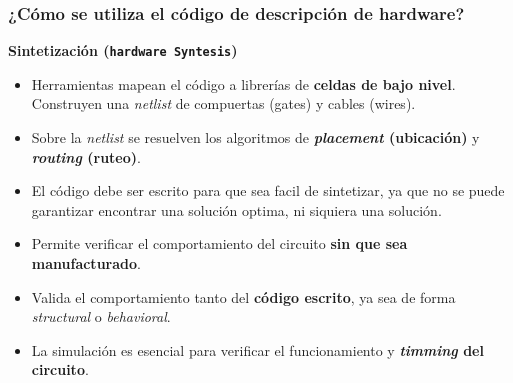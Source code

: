 \documentclass[aspectratio=169]{beamer}
\begin{document}
\begin{frame}[fragile,t]
\frametitle{¿Cómo se utiliza el código de descripción de hardware?}
    \textcolor{naranjauca}{\textbf{Sintetización (\texttt{hardware Syntesis})}}
    \begin{itemize}
    \item<1-> Herramientas mapean el código a librerías de \textbf{celdas de bajo nivel}.\\
    Construyen una \emph{netlist} de compuertas (gates) y cables (wires).
    \item<2-> Sobre la \emph{netlist} se resuelven los algoritmos de \textbf{\emph{placement} (ubicación)} y \textbf{\emph{routing} (ruteo)}.
    \item<3-> \textcolor{verdeuca}{El código debe ser escrito para que sea facil de sintetizar, ya que no se puede garantizar encontrar una solución optima, ni siquiera una solución.}
    \end{itemize}
    \begin{itemize}
    \item<4-> Permite verificar el comportamiento del circuito \textbf{sin que sea manufacturado}.
    \item<5-> Valida el comportamiento tanto del \textbf{código escrito}, ya sea de forma \emph{structural} o \emph{behavioral}.
    \item<6-> La simulación es esencial para verificar el funcionamiento y \textbf{\emph{timming} del circuito}.
    \end{itemize}


\end{frame}
\end{document}
